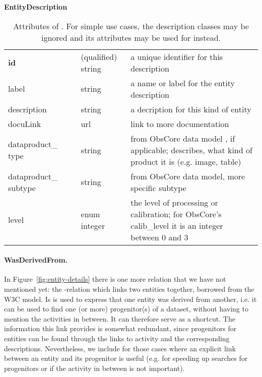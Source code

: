 \begin{table}[h]
\small
{}\textwidth
\textbf{\normalsize EntityDescription}\vspace{0.25em}\\
\begin{tabulary}{\textwidth}{@{}p{2.75cm}p{0cm}p{2cm}L@{}}
\toprule
{} & \head{} &  & \\
\midrule
\textbf{id} & & (qualified) string & a unique identifier for this description\\
label       & & string & a name or label for the entity description\\
description & & string & a decription for this kind of entity\\
docuLink    & & url & link to more documentation\\
dataproduct\_ type  & & string       & from ObsCore data model \citep{std:ObsCore}, if applicable; describes, what kind of product it is (e.g. image, table)\\
dataproduct\_ subtype & & string       & from ObsCore data model, more specific subtype\\
level       & & enum integer & the level of processing or calibration; for ObsCore's calib\_level it is an integer between 0 and 3\\
\bottomrule
\end{tabulary}
\caption{Attributes of . For simple use cases, 
the description classes may be ignored and its attributes may be used for 
 instead. 
}\label{tab:entitydescription-attributes}
\end{table}

\paragraph{WasDerivedFrom.}
In Figure~\ref{fig:entity-details} there is one more relation that we have not mentioned yet: 
the -relation which links two entities together, borrowed from the W3C model. 
Is is used to express that 
one entity was derived from another, i.e. it can be used to find one (or more) progenitor(s) 
of a dataset, without having to mention the activities in between. It can therefore serve as 
a shortcut. The information this link provides is somewhat redundant, since progenitors for entities
can be found through the links to activity and the corresponding descriptions.
Nevertheless, we include  for those cases where an explicit 
link between an entity and its progenitor is useful (e.g. for speeding up searches for 
progenitors or if the activity in between is not important).



